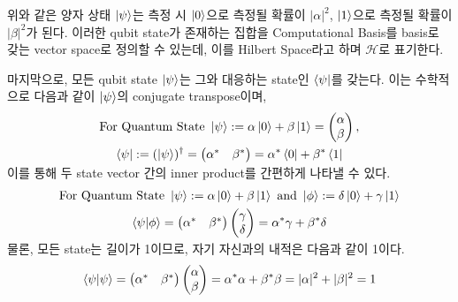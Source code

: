 \noindent 위와 같은 양자 상태 \( \ket\psi \)는 측정 시 \(\ket 0\)으로 측정될 확률이 \(|\alpha|^2\), \(\ket 1\)으로 측정될 확률이 \(|\beta|^2\)가 된다. %
이러한 qubit state가 존재하는 집합을 Computational Basis를 basis로 갖는 vector space로 정의할 수 있는데, 이를 Hilbert Space라고 하며 \(\mathcal{H}\)로 표기한다. %

\noindent 마지막으로, 모든 qubit state \(\ket \psi\)는 그와 대응하는 state인 \(\bra{\psi}\)를 갖는다. 이는 수학적으로 다음과 같이 \(\ket\psi\)의 conjugate transpose이며,
\begin{gather*}
\text{For Quantum State } \ket{\psi} := \alpha \ket{0} + \beta \ket{1} = \begin{pmatrix} \alpha \\ \beta \end{pmatrix}, \\
\vspace{-0.5em} %
\bra{\psi} := (\ket{\psi})^{\dagger} = \begin{pmatrix} \alpha^{*} & \beta^{*} \end{pmatrix} = \alpha^{*}\bra{0} + \beta^{*}\bra{1}
\end{gather*}
이를 통해 두 state vector 간의 inner product를 간편하게 나타낼 수 있다.
\begin{gather*}
    \text{For Quantum State } \ket{\psi} := \alpha \ket{0} + \beta \ket{1} \text{ and } \ket{\phi} := \delta \ket{0} + \gamma \ket{1} \\
\vspace{-0.5em} %
    \braket{\psi}{\phi} = \begin{pmatrix} \alpha^{*} & \beta^{*} \end{pmatrix} \begin{pmatrix} \gamma \\ \delta \end{pmatrix} = \alpha^{*}\gamma + \beta^{*}\delta
\end{gather*}
물론, 모든 state는 길이가 1이므로, 자기 자신과의 내적은 다음과 같이 1이다.
\[
    \braket{\psi}{\psi} = \begin{pmatrix} \alpha^{*} & \beta^{*} \end{pmatrix} \begin{pmatrix} \alpha \\ \beta \end{pmatrix} = \alpha^{*}\alpha + \beta^{*}\beta = |\alpha|^2 + |\beta|^2 = 1
\]

